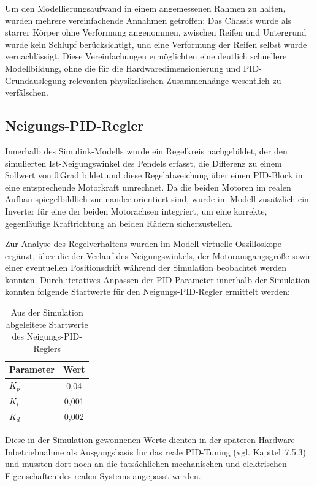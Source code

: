 \documentclass[12pt,ngerman,numbers=noenddot,abstracton,headsepline]{scrreprt}
\begin{document}
Um den Modellierungsaufwand in einem angemessenen Rahmen zu halten, wurden mehrere vereinfachende Annahmen getroffen: Das Chassis wurde als starrer Körper ohne Verformung angenommen, zwischen Reifen und Untergrund wurde kein Schlupf berücksichtigt, und eine Verformung der Reifen selbst wurde vernachlässigt. Diese Vereinfachungen ermöglichten eine deutlich schnellere Modellbildung, ohne die für die Hardwaredimensionierung und PID-Grundauslegung relevanten physikalischen Zusammenhänge wesentlich zu verfälschen.

\subsection{Neigungs-PID-Regler}
\label{subsec:simulink_neigungs_pid}

Innerhalb des Simulink-Modells wurde ein Regelkreis nachgebildet, der den simulierten Ist-Neigungswinkel des Pendels erfasst, die Differenz zu einem Sollwert von 0\,Grad bildet und diese Regelabweichung über einen PID-Block in eine entsprechende Motorkraft umrechnet. Da die beiden Motoren im realen Aufbau spiegelbildlich zueinander orientiert sind, wurde im Modell zusätzlich ein Inverter für eine der beiden Motorachsen integriert, um eine korrekte, gegenläufige Kraftrichtung an beiden Rädern sicherzustellen.

Zur Analyse des Regelverhaltens wurden im Modell virtuelle Oszilloskope ergänzt, über die der Verlauf des Neigungswinkels, der Motorausgangsgröße sowie einer eventuellen Positionsdrift während der Simulation beobachtet werden konnten. Durch iteratives Anpassen der PID-Parameter innerhalb der Simulation konnten folgende Startwerte für den Neigungs-PID-Regler ermittelt werden:

\begin{table}[h]
    \centering
    \caption{Aus der Simulation abgeleitete Startwerte des Neigungs-PID-Reglers}
    \label{tab:pid_neigung_sim}
    \begin{tabular}{|l|c|}
        \hline
        \textbf{Parameter} & \textbf{Wert} \\
        \hline
        $K_p$ & 0,04 \\
        \hline
        $K_i$ & 0,001 \\
        \hline
        $K_d$ & 0,002 \\
        \hline
    \end{tabular}
\end{table}

Diese in der Simulation gewonnenen Werte dienten in der späteren Hardware-Inbetriebnahme als Ausgangsbasis für das reale PID-Tuning (vgl. Kapitel~7.5.3) und mussten dort noch an die tatsächlichen mechanischen und elektrischen Eigenschaften des realen Systems angepasst werden.
\end{document}
